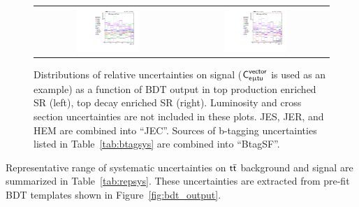 \begin{figure}[tbh!]
 \begin{center}
 \begin{tabular}{cc}
    \includegraphics[width=0.45\textwidth]{figures/Part3/Systematics/sysBDT_ST_sig_2017}&
  \includegraphics[width=0.45\textwidth]{figures/Part3/Systematics/sysBDT_TT_sig_2017} \\
 \end{tabular}
 \caption{Distributions of relative uncertainties on signal ($\textsf{C}^{\textsf{vector}}_{\textsf{e}\upmu\textsf{t{u}}}$ is used as an example) as a function of BDT output in top production enriched \ac{SR} (left), top decay enriched \ac{SR} (right). Luminosity and cross section uncertainties are not included in these plots. \ac{JES}, \ac{JER}, and HEM are combined into ``JEC''. Sources of b-tagging uncertainties listed in Table~\ref{tab:btagsys} are combined into ``BtagSF''.}
 \label{fig:Comp_sys_signal}
 \end{center}
\end{figure}

Representative range of systematic uncertainties on $\textsf{t}\overline{\textsf{t}}$ background and signal are summarized in Table~\ref{tab:repsys}. These uncertainties are extracted from pre-fit BDT templates shown in Figure~\ref{fig:bdt_output}.

